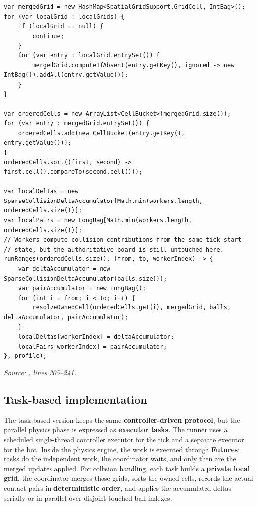 \begin{lstlisting}[style=codestyle,caption={Threaded cell reconstruction and collision dispatch},label={lst:threaded-cell-reconstruction}]
var mergedGrid = new HashMap<SpatialGridSupport.GridCell, IntBag>();
for (var localGrid : localGrids) {
    if (localGrid == null) {
        continue;
    }
    for (var entry : localGrid.entrySet()) {
        mergedGrid.computeIfAbsent(entry.getKey(), ignored -> new IntBag()).addAll(entry.getValue());
    }
}

var orderedCells = new ArrayList<CellBucket>(mergedGrid.size());
for (var entry : mergedGrid.entrySet()) {
    orderedCells.add(new CellBucket(entry.getKey(), entry.getValue()));
}
orderedCells.sort((first, second) -> first.cell().compareTo(second.cell()));

var localDeltas = new SparseCollisionDeltaAccumulator[Math.min(workers.length, orderedCells.size())];
var localPairs = new LongBag[Math.min(workers.length, orderedCells.size())];
// Workers compute collision contributions from the same tick-start
// state, but the authoritative board is still untouched here.
runRanges(orderedCells.size(), (from, to, workerIndex) -> {
    var deltaAccumulator = new SparseCollisionDeltaAccumulator(balls.size());
    var pairAccumulator = new LongBag();
    for (int i = from; i < to; i++) {
        resolveOwnedCell(orderedCells.get(i), mergedGrid, balls, deltaAccumulator, pairAccumulator);
    }
    localDeltas[workerIndex] = deltaAccumulator;
    localPairs[workerIndex] = pairAccumulator;
}, profile);
\end{lstlisting}

\noindent\textit{Source: , lines 205--241.}

\subsection{Task-based implementation}

The task-based version keeps the same \textbf{controller-driven protocol}, but the parallel physics phase is expressed as \textbf{executor tasks}. The runner uses a scheduled single-thread controller executor for the tick and a separate executor for the bot. Inside the physics engine, the work is executed through \textbf{Futures}: tasks do the independent work, the coordinator waits, and only then are the merged updates applied. For collision handling, each task builds a \textbf{private local grid}, the coordinator merges those grids, sorts the owned cells, records the actual contact pairs in \textbf{deterministic order}, and applies the accumulated deltas serially or in parallel over disjoint touched-ball indexes.

